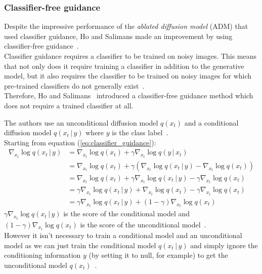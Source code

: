 \documentclass[twoside]{article}
\numberwithin{equation}{section}
\numberwithin{figure}{section}
\begin{document}
\subsubsection{Classifier-free guidance}
Despite the impressive performance of the \textit{ablated diffusion model} (ADM) that used classifier guidance, Ho and Salimans made an improvement by using classifier-free guidance~\cite{ho2022classifierfree}. \\
Classifier guidance requires a classifier to be trained on noisy images. This means that not only does it require training a classifier in addition to the generative model, but it also requires the classifier to be trained on noisy images for which pre-trained classifiers do not generally exist~\cite{ho2022classifierfree}. \\
Therefore, Ho and Salimans~\cite{ho2022classifierfree} introduced a classifier-free guidance method which does not require a trained classifier at all. 

The authors use an unconditional diffusion model $q(x_t)$ and a conditional diffusion model $q(x_t \, | \, y)$ where $y$ is the class label~\cite{ho2022classifierfree, luo2022understanding}. \\
Starting from equation (\ref{eq:classifier_guidance}):
\begin{align}
  \nabla_{x_t} \log q(x_t \, | \, y) &= \nabla_{x_t} \log q(x_t) + \gamma \nabla_{x_t} \log q(y \, | \, x_t) \\
  &= \nabla_{x_t} \log q(x_t) + \gamma \left( \nabla_{x_t} \log q (x_t \, | \, y) - \nabla_{x_t} \log q(x_t) \right) \\
  &= \nabla_{x_t} \log q(x_t) + \gamma \nabla_{x_t} \log q (x_t \, | \, y) - \gamma \nabla_{x_t} \log q(x_t) \\
  &= \gamma \nabla_{x_t} \log q (x_t \, | \, y) + \nabla_{x_t} \log q(x_t) - \gamma \nabla_{x_t} \log q(x_t) \\
  &= \gamma \nabla_{x_t} \log q (x_t \, | \, y) + (1 - \gamma) \nabla_{x_t} \log q(x_t)
\end{align}
$\gamma \nabla_{x_t} \log q (x_t \, | \, y)$ is the score of the conditional model and $(1 - \gamma) \nabla_{x_t} \log q(x_t)$ is the score of the unconditional model~\cite{luo2022understanding}. \\
However it isn't necessary to train a conditional model and an unconditional model as we can just train the conditional model $q(x_t \, | \, y)$ and simply ignore the conditioning information $y$ (by setting it to null, for example) to get the unconditional model $q(x_t)$~\cite{ho2022classifierfree,luo2022understanding}. \\
\newpage
\end{document}
